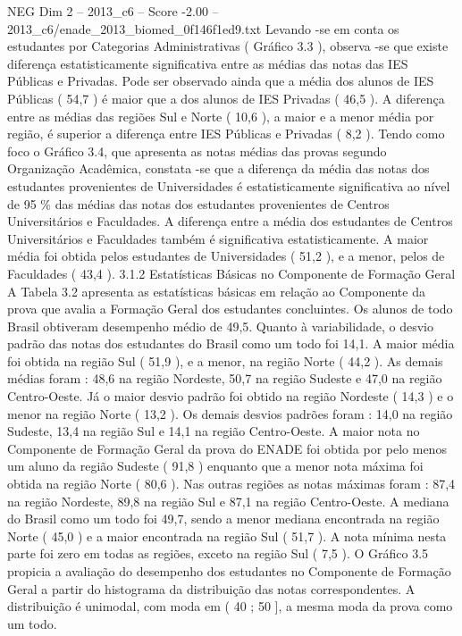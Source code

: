 \begin{textsample}{NEG Dim 2 – 2013\_c6 – Score -2.00 – 2013\_c6/enade\_2013\_biomed\_0f146f1ed9.txt}
Levando -se em conta os estudantes por Categorias Administrativas ( Gráfico 3.3 ), observa -se que existe diferença estatisticamente significativa entre as médias das notas das IES Públicas e Privadas.
Pode ser observado ainda que a média dos alunos de IES Públicas ( 54,7 ) é maior que a dos alunos de IES Privadas ( 46,5 ).
A diferença entre as médias das regiões Sul e Norte ( 10,6 ), a maior e a menor média por região, é superior a diferença entre IES Públicas e Privadas ( 8,2 ).
Tendo como foco o Gráfico 3.4, que apresenta as notas médias das provas segundo Organização Acadêmica, constata -se que a diferença da média das notas dos estudantes provenientes de Universidades é estatisticamente significativa ao nível de 95 \% das médias das notas dos estudantes provenientes de Centros Universitários e Faculdades.
A diferença entre a média dos estudantes de Centros Universitários e Faculdades também é significativa estatisticamente.
A maior média foi obtida pelos estudantes de Universidades ( 51,2 ), e a menor, pelos de Faculdades ( 43,4 ). 3.1.2 Estatísticas Básicas no Componente de Formação Geral A Tabela 3.2 apresenta as estatísticas básicas em relação ao Componente da prova que avalia a Formação Geral dos estudantes concluintes.
Os alunos de todo Brasil obtiveram desempenho médio de 49,5.
Quanto à variabilidade, o desvio padrão das notas dos estudantes do Brasil como um todo foi 14,1.
A maior média foi obtida na região Sul ( 51,9 ), e a menor, na região Norte ( 44,2 ).
As demais médias foram : 48,6 na região Nordeste, 50,7 na região Sudeste e 47,0 na região Centro-Oeste.
Já o maior desvio padrão foi obtido na região Nordeste ( 14,3 ) e o menor na região Norte ( 13,2 ).
Os demais desvios padrões foram : 14,0 na região Sudeste, 13,4 na região Sul e 14,1 na região Centro-Oeste.
A maior nota no Componente de Formação Geral da prova do ENADE foi obtida por pelo menos um aluno da região Sudeste ( 91,8 ) enquanto que a menor nota máxima foi obtida na região Norte ( 80,6 ).
Nas outras regiões as notas máximas foram : 87,4 na região Nordeste, 89,8 na região Sul e 87,1 na região Centro-Oeste.
A mediana do Brasil como um todo foi 49,7, sendo a menor mediana encontrada na região Norte ( 45,0 ) e a maior encontrada na região Sul ( 51,7 ).
A nota mínima nesta parte foi zero em todas as regiões, exceto na região Sul ( 7,5 ).
O Gráfico 3.5 propicia a avaliação do desempenho dos estudantes no Componente de Formação Geral a partir do histograma da distribuição das notas correspondentes.
A distribuição é unimodal, com moda em ( 40 ; 50 ], a mesma moda da prova como um todo.

\end{textsample}
